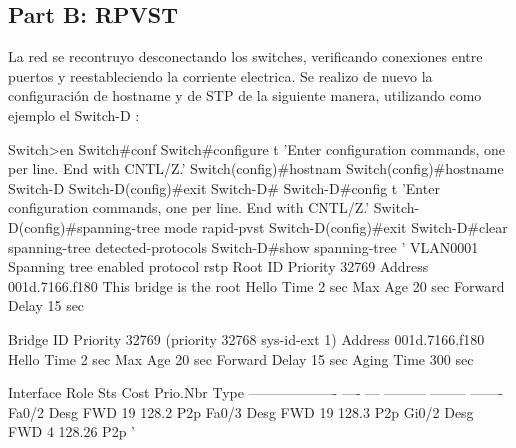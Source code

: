 
\subsection*{Part B: RPVST}
La red se recontruyo desconectando los switches, verificando conexiones entre puertos
y reestableciendo la corriente electrica. Se realizo de nuevo la configuración de hostname
y de STP de la siguiente manera, utilizando como ejemplo el Switch-D :

\begin{darkcode}
Switch>en
Switch#conf
Switch#configure t
'Enter configuration commands, one per line.  End with CNTL/Z.'
Switch(config)#hostnam
Switch(config)#hostname Switch-D
Switch-D(config)#exit
Switch-D#
Switch-D#config t
'Enter configuration commands, one per line.  End with CNTL/Z.'
Switch-D(config)#spanning-tree mode rapid-pvst 
Switch-D(config)#exit  
Switch-D#clear spanning-tree detected-protocols 
Switch-D#show spanning-tree                     
'
VLAN0001
  Spanning tree enabled protocol rstp
  Root ID    Priority    32769
             Address     001d.7166.f180
             This bridge is the root
             Hello Time   2 sec  Max Age 20 sec  Forward Delay 15 sec

  Bridge ID  Priority    32769  (priority 32768 sys-id-ext 1)
             Address     001d.7166.f180
             Hello Time   2 sec  Max Age 20 sec  Forward Delay 15 sec
             Aging Time  300 sec

Interface           Role Sts Cost      Prio.Nbr Type
------------------- ---- --- --------- -------- -------
Fa0/2               Desg FWD 19        128.2    P2p 
Fa0/3               Desg FWD 19        128.3    P2p 
Gi0/2               Desg FWD 4         128.26   P2p 
'
\end{darkcode}

